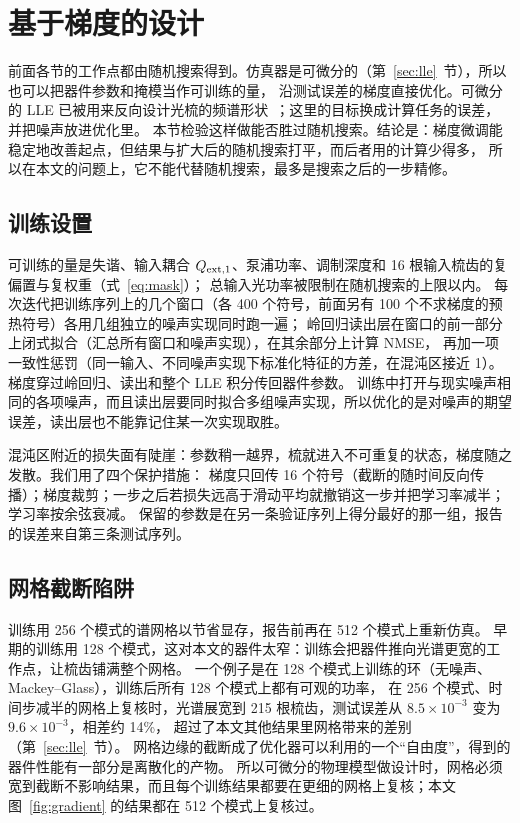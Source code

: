 \section{基于梯度的设计}\label{sec:gradient}

前面各节的工作点都由随机搜索得到。仿真器是可微分的（第~\ref{sec:lle}~节），所以也可以把器件参数和掩模当作可训练的量，
沿测试误差的梯度直接优化。可微分的 LLE 已被用来反向设计光梳的频谱形状~\cite{chuchalin2026}；这里的目标换成计算任务的误差，并把噪声放进优化里。
本节检验这样做能否胜过随机搜索。结论是：梯度微调能稳定地改善起点，但结果与扩大后的随机搜索打平，而后者用的计算少得多，
所以在本文的问题上，它不能代替随机搜索，最多是搜索之后的一步精修。

\subsection{训练设置}

可训练的量是失谐、输入耦合 $Q_{\mathrm{ext},1}$、泵浦功率、调制深度和 16 根输入梳齿的复偏置与复权重（式~\eqref{eq:mask}）；
总输入光功率被限制在随机搜索的上限以内。
每次迭代把训练序列上的几个窗口（各 400 个符号，前面另有 100 个不求梯度的预热符号）各用几组独立的噪声实现同时跑一遍；
岭回归读出层在窗口的前一部分上闭式拟合（汇总所有窗口和噪声实现），在其余部分上计算 NMSE，
再加一项一致性惩罚（同一输入、不同噪声实现下标准化特征的方差，在混沌区接近 1）。
梯度穿过岭回归、读出和整个 LLE 积分传回器件参数。
训练中打开与现实噪声相同的各项噪声，而且读出层要同时拟合多组噪声实现，所以优化的是对噪声的期望误差，读出层也不能靠记住某一次实现取胜。

混沌区附近的损失面有陡崖：参数稍一越界，梳就进入不可重复的状态，梯度随之发散。我们用了四个保护措施：
梯度只回传 16 个符号（截断的随时间反向传播）；梯度裁剪；一步之后若损失远高于滑动平均就撤销这一步并把学习率减半；学习率按余弦衰减。
保留的参数是在另一条验证序列上得分最好的那一组，报告的误差来自第三条测试序列。

\subsection{网格截断陷阱}

训练用 256 个模式的谱网格以节省显存，报告前再在 512 个模式上重新仿真。
早期的训练用 128 个模式，这对本文的器件太窄：训练会把器件推向光谱更宽的工作点，让梳齿铺满整个网格。
一个例子是在 128 个模式上训练的环（无噪声、Mackey--Glass），训练后所有 128 个模式上都有可观的功率，
在 256 个模式、时间步减半的网格上复核时，光谱展宽到 215 根梳齿，测试误差从 $8.5\times10^{-3}$ 变为 $9.6\times10^{-3}$，相差约 14\%，
超过了本文其他结果里网格带来的差别（第~\ref{sec:lle}~节）。
网格边缘的截断成了优化器可以利用的一个“自由度”，得到的器件性能有一部分是离散化的产物。
所以可微分的物理模型做设计时，网格必须宽到截断不影响结果，而且每个训练结果都要在更细的网格上复核；本文图~\ref{fig:gradient} 的结果都在 512 个模式上复核过。

